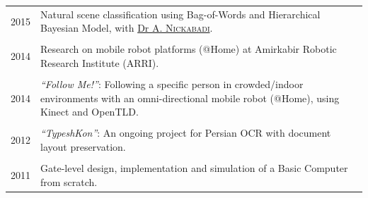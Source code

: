 %


\vspace{1mm}


\begin{tabularx}{0.98\textwidth}{r X}

  \textsc{2015} &
  Natural scene classification using Bag-of-Words and Hierarchical Bayesian Model,
  with \href{http://ceit.aut.ac.ir/~nikabadi/}{Dr \textsc{A. Nickabadi}}.
  \\ \vspace{-2.5mm} \\

  \textsc{2014} &
  Research on mobile robot platforms (@Home) at Amirkabir Robotic Research Institute (ARRI).
  \\ \vspace{-2.5mm} \\

  \textsc{2014} &
  \textit{``Follow Me!''}: Following a specific person in crowded/indoor environments
  with an omni-directional mobile robot (@Home), using Kinect and OpenTLD.
  \\ \vspace{-2.5mm} \\

  \textsc{2012} &
  \textit{``TypeshKon''}: An ongoing project for Persian OCR with document layout preservation.
  \\ \vspace{-2.5mm} \\

  \textsc{2011} &
  Gate-level design, implementation and simulation of a Basic Computer from scratch.

\end{tabularx}

